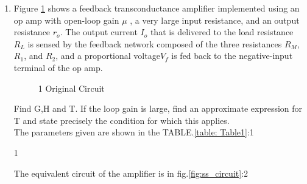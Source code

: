 \begin{enumerate}[label=\thesubsection.\arabic*.,ref=\thesubsection.\theenumi]

\item
Figure \ref{fig:original_circuit} shows a feedback transconductance
amplifier implemented using an op amp with open-loop gain $\mu$
, a very large input resistance, and an output resistance $r_{o}$.
The output current $I_{o}$ that is delivered to the load resistance $R_{L}$
is sensed by the feedback network composed of the three
resistances $R_{M}$, $R_{1}$, and $R_{2}$, and a proportional voltage$V_{f}$
is fed back to the negative-input terminal of the op amp.\\

\begin{figure}[!ht]
	\begin{center}
		\resizebox{\columnwidth}{!}{}
	\end{center}
\caption{1 Original Circuit}
\label{fig:original_circuit}
\end{figure}


Find G,H and T. If the loop gain is large, find an approximate expression for T
and state precisely the condition for which this applies.\\

\solution
The parameters given are shown in the TABLE.\ref{table: Table1}:1
\begin{table}[!ht]
\centering

\caption{1}
\label{table: Table1}
\end{table}
The equivalent circuit of the amplifier is in fig.\ref{fig:ss_circuit}:2


\end{enumerate}
